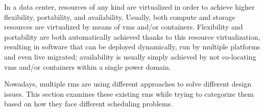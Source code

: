 In a data center, resources of any kind are virtualized in order to achieve higher flexibility, portability, and availability.
Usually, both compute and storage resources are virtualized by means of \glspl{vm} and/or containers.
Flexibility and portability are both automatically achieved thanks to this resource virtualization, resulting in software that can be deployed dynamically, run by multiple platforms and even live migrated; availability is usually simply achieved by not co-locating \glspl{vm} and/or containers within a single power domain.

Nowadays, multiple \glspl{rm} are using different approaches to solve different design issues.
This section examines these existing \glspl{rm} while trying to categorize them based on how they face different scheduling problems.